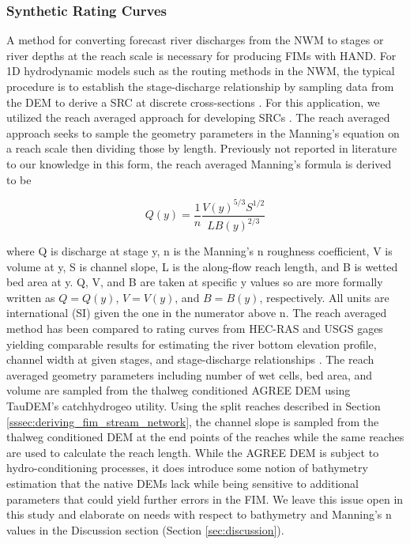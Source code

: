 \documentclass[draft]{dependencies/agujournal2019}
\begin{document}
\subsubsection{Synthetic Rating Curves}
\label{sssec:synthetic_rating_curve}
%
A method for converting forecast river discharges from the NWM to stages or river depths at the reach scale is necessary for producing FIMs with HAND. 
For 1D hydrodynamic models such as the routing methods in the NWM, the typical procedure is to establish the stage-discharge relationship by sampling data from the DEM to derive a SRC at discrete cross-sections \cite{quintero2021development,di2011hydraulic}. 
For this application, we utilized the reach averaged approach for developing SRCs \cite{zheng2018river}.
The reach averaged approach seeks to sample the geometry parameters in the Manning's equation \cite{gauckler1867etudes,manning1890flow} on a reach scale then dividing those by length. 
Previously not reported in literature to our knowledge in this form, the reach averaged Manning's formula is derived to be 
%
\begin{linenomath*}
\begin{equation}
\label{eq:reach_averaged_mannings_equation}
Q(y) = \frac{1}{n} \frac{V(y)^{5/3}S^{1/2}}{L B(y)^{2/3}} 
\end{equation}
\end{linenomath*}
%
where Q is discharge at stage y, n is the Manning's n roughness coefficient, V is volume at y, S is channel slope, L is the along-flow reach length, and B is wetted bed area at y.
Q, V, and B are taken at specific y values so are more formally written as $Q = Q(y)$, $V = V(y)$, and $B = B(y)$, respectively.
All units are international (SI) given the one in the numerator above n.
The reach averaged method has been compared to rating curves from HEC-RAS and USGS gages yielding comparable results for estimating the river bottom elevation profile, channel width at given stages, and stage-discharge relationships \cite{zheng2018river}.
The reach averaged geometry parameters including number of wet cells, bed area, and volume are sampled from the thalweg conditioned AGREE DEM using TauDEM's catchhydrogeo utility.
Using the split reaches described in Section \ref{sssec:deriving_fim_stream_network}, the channel slope is sampled from the thalweg conditioned DEM at the end points of the reaches while the same reaches are used to calculate the reach length.
While the AGREE DEM is subject to hydro-conditioning processes, it does introduce some notion of bathymetry estimation that the native DEMs lack while being sensitive to additional parameters that could yield further errors in the FIM.
We leave this issue open in this study and elaborate on needs with respect to bathymetry and Manning's n values in the Discussion section (Section \ref{sec:discussion}).
\end{document}
